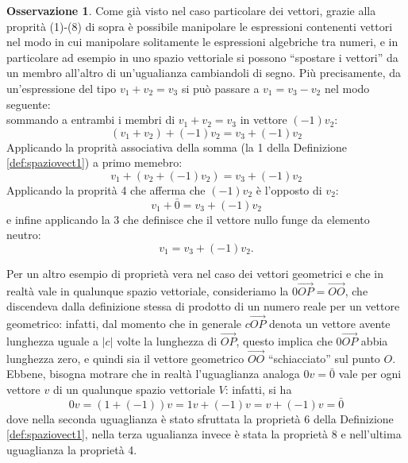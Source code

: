 \documentclass{book}
\newcommand{\abs}[1]{\lvert#1\rvert}
\theoremstyle{definition}
\newtheorem{oss}{Osservazione}[section]
\theoremstyle{plain}
\begin{document}
\begin{oss}
  \label{oss:spaziovect1}
  Come già visto nel caso particolare dei vettori, grazie alla proprità (1)-(8) di sopra è possibile manipolare le espressioni contenenti vettori nel modo in cui manipolare solitamente le espressioni algebriche tra numeri, e in particolare ad esempio in uno spazio vettoriale si possono ``spostare i vettori'' da un membro all'altro di un'ugualianza cambiandoli di segno. Più precisamente, da un'espressione del tipo $v_1+v_2=v_3$ si può passare a $v_1=v_3-v_2$ nel modo seguente:\\
  sommando a entrambi i membri di $v_1+v_2=v_3$ in vettore $(-1)v_2$:
  \begin{equation*}
    (v_1+v_2)+(-1)v_2=v_3+(-1)v_2
  \end{equation*}
  Applicando la proprità associativa della somma (la 1 della Definizione \ref{def:spaziovect1}) a primo memebro:
  \begin{equation*}
    v_1+(v_2+(-1)v_2)=v_3+(-1)v_2
  \end{equation*}
  Applicando la proprità 4 che afferma che $(-1)v_2$ è l'opposto di $v_2$:
  \begin{equation*}
    v_1+\bar{0}=v_3+(-1)v_2
  \end{equation*}
  e infine applicando la 3 che definisce che il vettore nullo funge da elemento neutro:
  \begin{equation*}
    v_1=v_3+(-1)v_2.
  \end{equation*}
\end{oss}
Per un altro esempio di proprietà vera nel caso dei vettori geometrici e che in realtà vale in qualunque spazio vettoriale, consideriamo la $0\vec{OP}=\vec{OO}$, che discendeva dalla definizione stessa di prodotto di un numero reale per un vettore geometrico: infatti, dal momento che in generale $c\vec{OP}$ denota un vettore avente lunghezza uguale a $\abs{c}$ volte la lunghezza di $\vec{OP}$, questo implica che $0\vec{OP}$ abbia lunghezza zero, e quindi sia il vettore geometrico $\vec{OO}$ ``schiacciato'' sul punto $O$.\\
Ebbene, bisogna motrare che in realtà l'uguaglianza analoga $0v=\bar{0}$ vale per ogni vettore $v$ di un qualunque spazio vettoriale $V$: infatti, si ha
\begin{equation*}
  0v=(1+(-1))v=1v+(-1)v=v+(-1)v=\bar{0}
\end{equation*}
dove nella seconda uguaglianza è stato sfruttata la proprietà 6 della Definizione \ref{def:spaziovect1}, nella terza ugualianza invece è stata la proprietà 8 e nell'ultima uguaglianza la proprietà 4.\\
\end{document}
